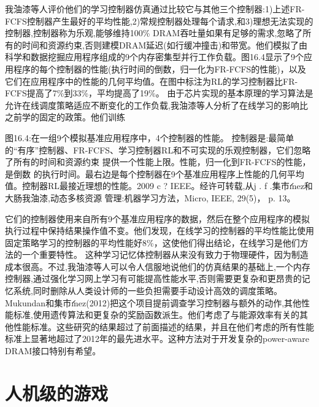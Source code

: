 我̇油漆等人评价他们的学习控制器仿真通过比较它与其他三个控制器:1)上述FR-FCFS控制器产生最好的平均性能,2)常规控制器处理每个请求,和3)理想无法实现的控制器,控制器称为乐观,能够维持100\% DRAM吞吐量如果有足够的需求,忽略了所有的时间和资源约束,否则建模DRAM延迟(如行缓冲撞击)和带宽。他们模拟了由科学和数据挖掘应用程序组成的9个内存密集型并行工作负载。图16.4显示了9个应用程序的每个控制器的性能(执行时间的倒数，归一化为FR-FCFS的性能)，以及它们在应用程序中的性能的几何平均值。在图中标注为RL的学习控制器比FR-FCFS提高了7\%到33\%，平均提高了19\%。
由于芯片实现的基本原理的学习算法是允许在线调度策略适应不断变化的工作负载,我̇油漆等人分析了在线学习的影响比之前学的固定的政策。他们训练
 
 

图16.4:在一组9个模拟基准应用程序中，4个控制器的性能。
控制器是:最简单的“有序”控制器、FR-FCFS、学习控制器RL和不可实现的乐观控制器，它们忽略了所有的时间和资源约束
提供一个性能上限。性能，归一化到FR-FCFS的性能，是倒数
的执行时间。最右边是每个控制器在9个基准应用程序上性能的几何平均值。控制器RL最接近理想的性能。2009 c ?
IEEE。经许可转载,从j . f .集市́ınez和大肠我̇油漆,动态多核资源
管理:机器学习方法，Micro, IEEE, 29(5)， p. 13。


它们的控制器使用来自所有9个基准应用程序的数据，然后在整个应用程序的模拟执行过程中保持结果操作值不变。他们发现，在线学习的控制器的平均性能比使用固定策略学习的控制器的平均性能好8\%，这使他们得出结论，在线学习是他们方法的一个重要特性。
这种学习记忆体控制器从来没有致力于物理硬件，因为制造成本很高。不过,我̇油漆等人可以令人信服地说他们的仿真结果的基础上,一个内存控制器,通过强化学习网上学习有可能提高性能水平,否则需要更复杂和更昂贵的记忆系统,同时删除从人类设计师的一些负担需要手动设计高效的调度策略。Mukundan和集市́ınez(2012)把这个项目提前调查学习控制器与额外的动作,其他性能标准,使用遗传算法和更复杂的奖励函数派生。他们考虑了与能源效率有关的其他性能标准。这些研究的结果超过了前面描述的结果，并且在他们考虑的所有性能标准上显著地超过了2012年的最先进水平。这种方法对于开发复杂的power-aware DRAM接口特别有希望。


\section{人机级的游戏}

